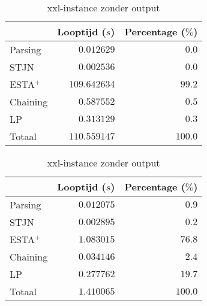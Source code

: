 \begin{table}[H]
\parbox{.45\linewidth}{
    \centering
    \begin{tabular}{| l | r | r |}
        \hline
                    & Looptijd ($s$)  & Percentage ($\%$) \\
        \hline
        Parsing     & $0.012629$      & $0.0$   \\
        STJN        & $0.002536$      & $0.0$   \\
        ESTA$^+$    & $109.642634$    & $99.2$  \\
        Chaining    & $0.587552$      & $0.5$   \\
        LP          & $0.313129$      & $0.3$   \\
        \hline \hline
        Totaal      & $110.559147$    & $100.0$ \\
        \hline
    \end{tabular}
    \caption{xxl-instance met output}
    \label{tbl:xxl+output}
}
\hfill
\parbox{.45\linewidth}{
    \centering
    \begin{tabular}{| l | r | r |}
        \hline
                    & Looptijd ($s$)& Percentage ($\%$) \\
        \hline
        Parsing     & $0.012075$      & $0.9$   \\
        STJN        & $0.002895$      & $0.2$   \\
        ESTA$^+$    & $1.083015$      & $76.8$  \\
        Chaining    & $0.034146$      & $2.4$   \\
        LP          & $0.277762$      & $19.7$  \\
        \hline \hline
        Totaal      & $1.410065$      & $100.0$ \\
        \hline
    \end{tabular}
    \caption{xxl-instance zonder output}
    \label{tbl:xxl-output}
}
\end{table}
